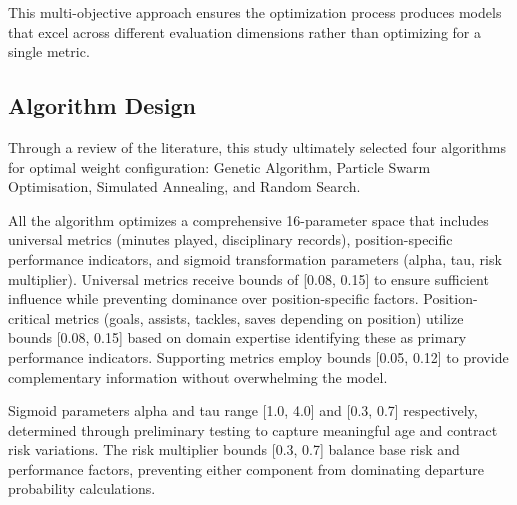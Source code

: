 This multi-objective approach ensures the optimization process produces models that excel across different evaluation dimensions rather than optimizing for a single metric.

\subsection{Algorithm Design}

Through a review of the literature, this study ultimately selected four algorithms for optimal weight configuration: Genetic Algorithm, Particle Swarm Optimisation, Simulated Annealing, and Random Search.

All the algorithm optimizes a comprehensive 16-parameter space that includes universal metrics (minutes played, disciplinary records), position-specific performance indicators, and sigmoid transformation parameters (alpha, tau, risk multiplier). Universal metrics receive bounds of [0.08, 0.15] to ensure sufficient influence while preventing dominance over position-specific factors. Position-critical metrics (goals, assists, tackles, saves depending on position) utilize bounds [0.08, 0.15] based on domain expertise identifying these as primary performance indicators. Supporting metrics employ bounds [0.05, 0.12] to provide complementary information without overwhelming the model.

Sigmoid parameters alpha and tau range [1.0, 4.0] and [0.3, 0.7] respectively, determined through preliminary testing to capture meaningful age and contract risk variations. The risk multiplier bounds [0.3, 0.7] balance base risk and performance factors, preventing either component from dominating departure probability calculations.
